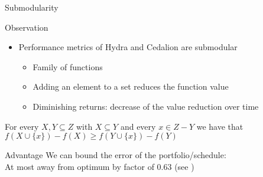 \begin{frame}[c]{Submodularity}

\begin{block}{Observation}
\begin{itemize}
\item Performance metrics of Hydra{} and Cedalion{} are submodular
\begin{itemize}
\item Family of functions
\item Adding an element to a set reduces the function value
\item Diminishing returns: decrease of the value reduction over time
\end{itemize}
\end{itemize}
\end{block}

\pause

\begin{definition}[Submodularity of $f$]
For every $X,Y \subseteq Z$ with $X \subseteq Y$ and every $x \in Z - Y$ we have that $f(X \cup \{x\}) - f(X) \geq f(Y \cup \{x\}) - f(Y)$
\end{definition}

\pause

\begin{block}{Advantage}
We can bound the error of the portfolio/schedule:\\ 
At most away from optimum by factor of $0.63$ (see )
\end{block}

\end{frame}
